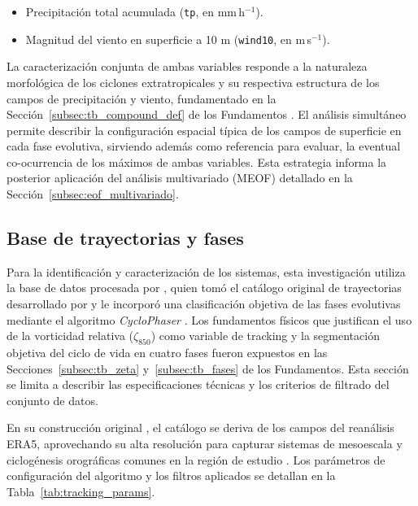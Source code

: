\begin{itemize}
    \item Precipitación total acumulada (\texttt{tp}, en mm\,h$^{-1}$).
    \item Magnitud del viento en superficie a 10 m (\texttt{wind10}, en m\,s$^{-1}$).
\end{itemize}

La caracterización conjunta de ambas variables responde a la naturaleza morfológica de los ciclones extratropicales y su respectiva estructura de los campos de precipitación y viento, fundamentado en la Sección~\ref{subsec:tb_compound_def} de los Fundamentos . El análisis simultáneo permite describir la configuración espacial típica de los campos de superficie en cada fase evolutiva, sirviendo además como referencia para evaluar, la eventual co-ocurrencia de los máximos de ambas variables. Esta estrategia informa la posterior aplicación del análisis multivariado (MEOF) detallado en la Sección~\ref{subsec:eof_multivariado}.

\subsection{Base de trayectorias y fases}\label{sec:bd_ciclones}

Para la identificación y caracterización de los sistemas, esta investigación utiliza la base de datos procesada por \citet{coutodesouza2024new}, quien tomó el catálogo original de trayectorias desarrollado por \citet{gramcianinov2019properties} y le incorporó una clasificación objetiva de las fases evolutivas mediante el algoritmo \textit{CycloPhaser} \citep{deSouza2025CycloPhaser}. Los fundamentos físicos que justifican el uso de la vorticidad relativa ($\zeta_{850}$) como variable de tracking y la segmentación objetiva del ciclo de vida en cuatro fases fueron expuestos en las Secciones~\ref{subsec:tb_zeta} y~\ref{subsec:tb_fases} de los Fundamentos. Esta sección se limita a describir las especificaciones técnicas y los criterios de filtrado del conjunto de datos.

En su construcción original \citep{gramcianinov2019properties}, el catálogo se deriva de los campos del reanálisis ERA5, aprovechando su alta resolución para capturar sistemas de mesoescala y ciclogénesis orográficas comunes en la región de estudio \citep{gramcianinov2020analysis}. Los parámetros de configuración del algoritmo y los filtros aplicados se detallan en la Tabla~\ref{tab:tracking_params}.



